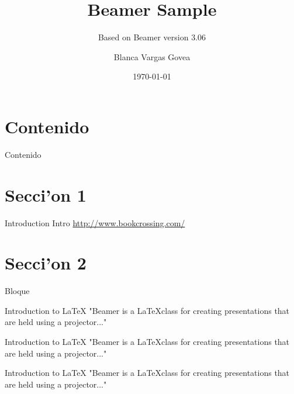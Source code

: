 \documentclass[xcolor=dvipsnames]{beamer}
\begin{document}
\title{Beamer Sample}
\subtitle{Based on Beamer version 3.06}
\author{Blanca Vargas Govea}
\date{\today}

\begin{frame}[plain] 
  \titlepage
\end{frame}
\section*{Contenido}
\begin{frame}{Contenido}
  \tableofcontents%
\end{frame}
\section{Secci'on 1}
\begin{frame}{Introduction}
Intro
\url{http://www.bookcrossing.com/}
\end{frame}

\section{Secci'on 2}

\begin{frame}{Bloque}
\begin{block}{Introduction to {\LaTeX}}
"Beamer is a {\LaTeX}class for creating presentations
that are held using a projector..."
\end{block}

\begin{example}{Introduction to {\LaTeX}}
"Beamer is a {\LaTeX}class for creating presentations
that are held using a projector..."
\end{example}

\begin{alertblock}{Introduction to {\LaTeX}}
"Beamer is a {\LaTeX}class for creating presentations
that are held using a projector..."
\end{alertblock}

\end{frame}
%
%
\end{document}
